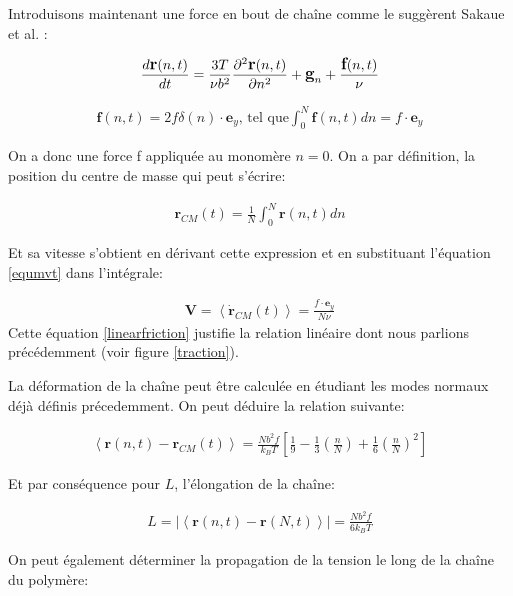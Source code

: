 Introduisons maintenant une force en bout de chaîne comme le suggèrent Sakaue et al. \cite{Sakaue2012}:

\begin{eqnarray}
\large{
\frac{d \textbf{r}(n,t)}{dt} =  \frac{3T}{\nu b^2}\frac{\partial ^2 \textbf{r}(n,t)}{\partial  n^2} + \textbf{g}_n} + \frac{\textbf{f}(n,t)}{\nu}
\label{equmvt}
\end{eqnarray}

\begin{eqnarray}
\textbf{f}(n,t) = 2f\delta(n)\cdot\textbf{e}_{y} \text{, tel que} \int_{0}^{N} \textbf{f}(n,t) dn = f \cdot \textbf{e}_{y} 
\end{eqnarray}

On a donc une force f appliquée au monomère $n=0$. On a par définition, la position du centre de masse qui peut s'écrire: 

\begin{eqnarray}
\mathbf{r}_{CM}(t) = \frac{1}{N}\int_{0}^{N} \textbf{r}(n,t) dn
\end{eqnarray}

Et sa vitesse s'obtient en dérivant cette expression et en substituant l'équation \ref{equmvt} dans l'intégrale:


\begin{eqnarray}
\textbf{V} = \left<\mathbf{\dot{r}}_{CM}(t)\right> = \frac{f \cdot \textbf{e}_{y}}{N\nu} 
\label{linearfriction}
\end{eqnarray}
Cette équation \ref{linearfriction} justifie la relation linéaire dont nous parlions précédemment (voir figure \ref{traction}).

La déformation de la chaîne peut être calculée en étudiant les modes normaux déjà définis précedemment. On peut déduire la relation suivante:


\begin{eqnarray}
\left<\mathbf{r}(n,t)-\mathbf{r}_{CM}(t)\right> = \frac{Nb^2f}{k_BT}\left[\frac{1}{9}-\frac{1}{3}\left(\frac{n}{N}\right)+\frac{1}{6}\left(\frac{n}{N}\right)^2\right] 
\label{distmonom}
\end{eqnarray}

Et par conséquence pour $L$, l'élongation de la chaîne: 

\begin{eqnarray}
L=|\left<\mathbf{r}(n,t)-\mathbf{r}(N,t)\right> | = \frac{Nb^2f}{6k_BT} 
\end{eqnarray}

On peut également déterminer la propagation de la tension le long de la chaîne du polymère:

